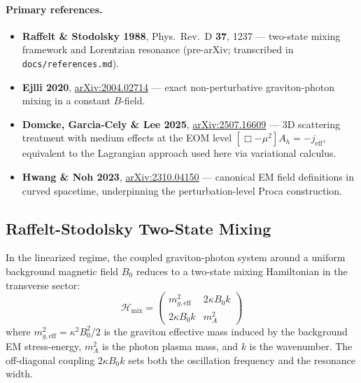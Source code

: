 \paragraph{Primary references.}
\begin{itemize}
  \item \textbf{Raffelt \& Stodolsky 1988}, Phys.\ Rev.\ D \textbf{37}, 1237 ---
    two-state mixing framework and Lorentzian resonance (pre-arXiv;
    transcribed in \texttt{docs/references.md}).
  \item \textbf{Ejlli 2020}, \href{https://arxiv.org/abs/2004.02714}{arXiv:2004.02714} ---
    exact non-perturbative graviton-photon mixing in a constant $B$-field.
  \item \textbf{Domcke, Garcia-Cely \& Lee 2025},
    \href{https://arxiv.org/abs/2507.16609}{arXiv:2507.16609} ---
    3D scattering treatment with medium effects at the EOM level
    $[\Box - \mu^2]A_h = -j_{\mathrm{eff}}$, equivalent to the
    Lagrangian approach used here via variational calculus.
  \item \textbf{Hwang \& Noh 2023},
    \href{https://arxiv.org/abs/2310.04150}{arXiv:2310.04150} ---
    canonical EM field definitions in curved spacetime, underpinning
    the perturbation-level Proca construction.
\end{itemize}

\subsection{Raffelt-Stodolsky Two-State Mixing}
\label{subsec:raffelt-stodolsky}

In the linearized regime, the coupled graviton-photon system around a
uniform background magnetic field $B_0$ reduces to a two-state mixing
Hamiltonian in the transverse sector:
\begin{equation}
  \mathcal{H}_{\mathrm{mix}} = \begin{pmatrix}
    m_{g,\mathrm{eff}}^2 & 2\kappa B_0 k \\
    2\kappa B_0 k & m_A^2
  \end{pmatrix}
  \label{eq:mixing-hamiltonian}
\end{equation}
where $m_{g,\mathrm{eff}}^2 = \kappa^2 B_0^2 / 2$ is the graviton effective
mass induced by the background EM stress-energy, $m_A^2$ is the photon
plasma mass, and $k$ is the wavenumber. The off-diagonal coupling
$2\kappa B_0 k$ sets both the oscillation frequency and the resonance
width.

